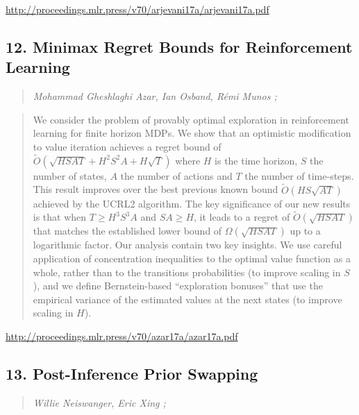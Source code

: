 \documentclass{article}
\begin{document}
\href{http://proceedings.mlr.press/v70/arjevani17a/arjevani17a.pdf}{http://proceedings.mlr.press/v70/arjevani17a/arjevani17a.pdf}

\subsection{12. Minimax Regret Bounds for Reinforcement Learning}

\begin{quote}
\footnotesize{\textit{Mohammad Gheshlaghi Azar, Ian Osband, Rémi Munos ;}}

\end{quote}

\begin{quote}
    We consider the problem of provably optimal exploration in reinforcement learning for finite horizon MDPs. We show that an optimistic modification to value iteration achieves a regret bound of $\tilde {O}( \sqrt{HSAT} + H^2S^2A+H\sqrt{T})$ where $H$ is the time horizon, $S$ the number of states, $A$ the number of actions and $T$ the number of time-steps. This result improves over the best previous known bound $\tilde {O}(HS \sqrt{AT})$ achieved by the UCRL2 algorithm. The key significance of our new results is that when $T\geq H^3S^3A$ and $SA\geq H$, it leads to a regret of $\tilde{O}(\sqrt{HSAT})$ that matches the established lower bound of $\Omega(\sqrt{HSAT})$ up to a logarithmic factor. Our analysis contain two key insights. We use careful application of concentration inequalities to the optimal value function as a whole, rather than to the transitions probabilities (to improve scaling in $S$), and we define Bernstein-based “exploration bonuses” that use the empirical variance of the estimated values at the next states (to improve scaling in $H$).  
\end{quote}

\href{http://proceedings.mlr.press/v70/azar17a/azar17a.pdf}{http://proceedings.mlr.press/v70/azar17a/azar17a.pdf}

\subsection{13. Post-Inference Prior Swapping}

\begin{quote}
\footnotesize{\textit{Willie Neiswanger, Eric Xing ;}}

\end{quote}
\end{document}
